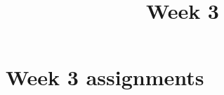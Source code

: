 \documentclass{xourse}
\title{Week 3}
\begin{document}
\begin{abstract}
\end{abstract}
\maketitle

\part{Week 3 assignments}
\end{document}
